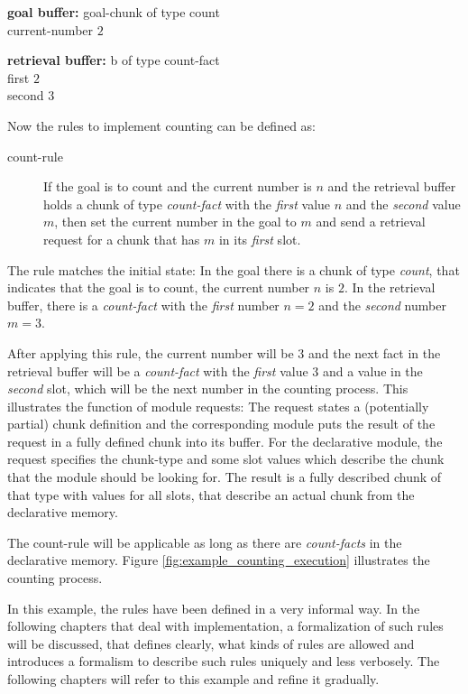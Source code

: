 \parbox{100mm}{\textbf{goal buffer:} goal-chunk of type count\\
\noindent\hspace*{20mm} current-number $2$}

\parbox{100mm}{\textbf{retrieval buffer:} b of type count-fact\\
\noindent\hspace*{20mm} first $2$\\
\noindent\hspace*{20mm} second $3$}

Now the rules to implement counting can be defined as:

\begin{description}
 \item[count-rule] If the goal is to count and the current number is $n$ and the retrieval buffer holds a chunk of type \emph{count-fact} with the \emph{first} value $n$ and the \emph{second} value $m$, then set the current number in the goal to $m$ and send a retrieval request for a chunk that has $m$ in its \emph{first} slot.
\end{description}

The rule matches the initial state: In the goal there is a chunk of type \emph{count}, that indicates that the goal is to count, the current number $n$ is $2$. In the retrieval buffer, there is a \emph{count-fact} with the \emph{first} number $n = 2$ and the \emph{second} number $m = 3$. 

After applying this rule, the current number will be $3$ and the next fact in the retrieval buffer will be a \emph{count-fact} with the \emph{first} value $3$ and a value in the \emph{second} slot, which will be the next number in the counting process. This illustrates the function of module requests: The request states a (potentially partial) chunk definition and the corresponding module puts the result of the request in a fully defined chunk into its buffer. For the declarative module, the request specifies the chunk-type and some slot values which describe the chunk that the module should be looking for. The result is a fully described chunk of that type with values for all slots, that describe an actual chunk from the declarative memory. 

The count-rule will be applicable as long as there are \emph{count-facts} in the declarative memory. Figure \ref{fig:example_counting_execution} illustrates the counting process.

In this example, the rules have been defined in a very informal way. In the following chapters that deal with implementation, a formalization of such rules will be discussed, that defines clearly, what kinds of rules are allowed and introduces a formalism to describe such rules uniquely and less verbosely. The following chapters will refer to this example and refine it gradually.


